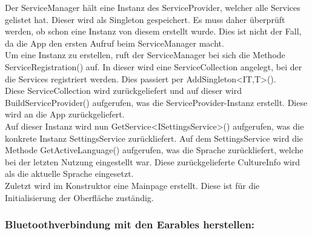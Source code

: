 \documentclass[a4paper,12pt]{article}
\begin{document}
Der ServiceManager hält eine Instanz des ServiceProvider, welcher alle Services gelistet hat. Dieser wird als Singleton gespeichert. Es muss daher überprüft werden, ob schon eine Instanz von diesem erstellt wurde. Dies ist nicht der Fall, da die App den ersten Aufruf beim ServiceManager macht.\\
Um eine Instanz zu erstellen, ruft der ServiceManager bei sich die Methode ServiceRegistration() auf. In dieser wird eine ServiceCollection angelegt, bei der die Services registriert werden. Dies passiert per AddSingleton<IT,T>(). \\
Diese ServiceCollection wird zurückgeliefert und auf dieser wird BuildServiceProvider() aufgerufen, was die ServiceProvider-Instanz erstellt.
Diese wird an die App zurückgeliefert.\\
Auf dieser Instanz wird nun GetService<ISettingsService>() aufgerufen, was die konkrete Instanz SettingsService zurückliefert.
Auf dem SettingsService wird die Methode GetActiveLanguage() aufgerufen, was die Sprache zurückliefert, welche bei der letzten Nutzung eingestellt war. 
Diese zurückgelieferte CultureInfo wird als die aktuelle Sprache eingesetzt.\\
Zuletzt wird im Konstruktor eine Mainpage erstellt. Diese ist für die Initialisierung der Oberfläche zuständig.\\


\newpage
\subsubsection{Bluetoothverbindung mit den Earables herstellen:}
\end{document}
